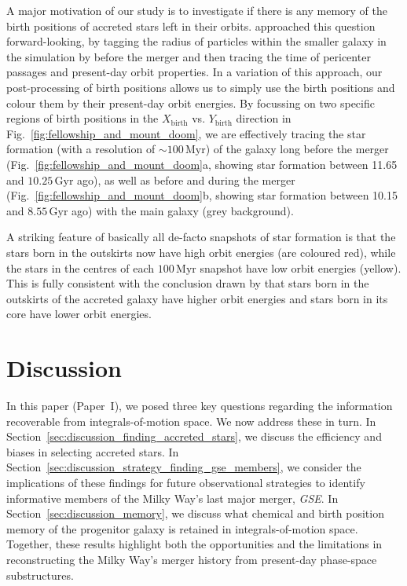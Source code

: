\documentclass[fleqn,usenatbib]{mnras}
\begin{document}
A major motivation of our study is to investigate if there is any memory of the birth positions of accreted stars left in their orbits. \citet{Skuladottir2025} approached this question forward-looking, by tagging the radius of particles within the smaller galaxy in the simulation by \citet{Mori2024} before the merger and then tracing the time of pericenter passages and present-day orbit properties. In a variation of this approach, our post-processing of birth positions allows us to simply use the birth positions and colour them by their present-day orbit energies. By focussing on two specific regions of birth positions in the $X_\mathrm{birth}$ vs. $Y_\mathrm{birth}$ direction in Fig.~\ref{fig:fellowship_and_mount_doom}, we are effectively tracing the star formation (with a resolution of $\sim 100\,\mathrm{Myr}$) of the galaxy long before the merger (Fig.~\ref{fig:fellowship_and_mount_doom}a, showing star formation between 11.65 and $10.25\,\mathrm{Gyr}$ ago), as well as before and during the merger (Fig.~\ref{fig:fellowship_and_mount_doom}b, showing star formation between 10.15 and $8.55\,\mathrm{Gyr}$ ago) with the main galaxy (grey background).

A striking feature of basically all de-facto snapshots of star formation is that the stars born in the outskirts now have high orbit energies (are coloured red), while the stars in the centres of each $100\,\mathrm{Myr}$ snapshot have low orbit energies (yellow). This is fully consistent with the conclusion drawn by \citet{Skuladottir2025} that stars born in the outskirts of the accreted galaxy have higher orbit energies and stars born in its core have lower orbit energies.

\section{Discussion}
\label{sec:discussion}

In this paper (Paper~I), we posed three key questions regarding the information recoverable from integrals-of-motion space. We now address these in turn. In Section~\ref{sec:discussion_finding_accreted_stars}, we discuss the efficiency and biases in selecting accreted stars. In Section~\ref{sec:discussion_strategy_finding_gse_members}, we consider the implications of these findings for future observational strategies to identify informative members of the Milky Way’s last major merger, \textit{GSE}. In Section~\ref{sec:discussion_memory}, we discuss what chemical and birth position memory of the progenitor galaxy is retained in integrals-of-motion space. Together, these results highlight both the opportunities and the limitations in reconstructing the Milky Way’s merger history from present-day phase-space substructures.
\end{document}
